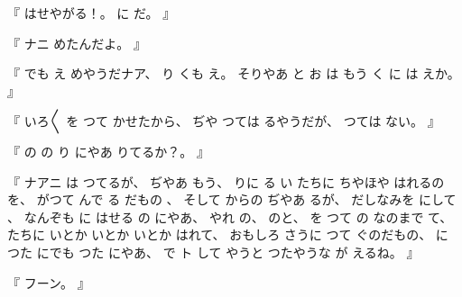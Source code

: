 %
『
はせやがる！。
%
に
だ。
』

%
『
ナニ
めたんだよ。
』

%
『
でも
え
めやうだナア、
%
り
くも
え。
%
そりやあ
と
お
は
もう
く
に
は
えか。
』

%
『
いろ〳〵
を
つて
かせたから、
%
ぢや
つては
るやうだが、
%
つては
ない。
』

%
『
の
の
り
にやあ
りてるか？。
』

%
『
ナアニ
は%
つてるが、
%
ぢやあ
もう、
%
りに
る
い
たちに
ちやほや
はれるのを、
%
がつて
んで
る
だもの
、
%
%
そして
からの
ぢやあ
るが、
%
だしなみを
にして
、
%
%
なんぞも
に
はせる
の
にやあ、
%
やれ
の、
%
のと、
%
を
つて
の
なのまで
て、
%
たちに
いとか
いとか
いとか
はれて、
%
おもしろ
さうに
つて
ぐのだもの、
%
に
つた
にでも
つた
にやあ、
%
で
ト
して
やうと
つたやうな
が
えるね。
』

%
『
フーン。
』


